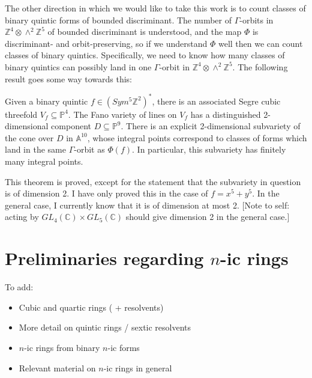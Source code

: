 \documentclass{report}
\begin{document}
The other direction in which we would like to take this work is to count classes of binary quintic forms of bounded discriminant.  The number of $\Gamma$-orbits in $\mathbb{Z}^4 \otimes \wedge^2 \mathbb{Z}^5$ of bounded discriminant is understood, and the map $\Phi$ is discriminant- and orbit-preserving, so if we understand $\Phi$ well then we can count classes of binary quintics.  Specifically, we need to know how many classes of binary quintics can possibly land in one $\Gamma$-orbit in $\mathbb{Z}^4 \otimes \wedge^2 \mathbb{Z}^5$.  The following result goes some way towards this:

\begin{theorem} [In Progress]
Given a binary quintic $f \in (Sym^5 \mathbb{Z}^2)^*$, there is an associated Segre cubic threefold $V_f \subseteq \mathbb{P}^4$.  The Fano variety of lines on $V_f$ has a distinguished 2-dimensional component $D \subseteq \mathbb{P}^9$.  There is an explicit 2-dimensional subvariety of the cone over $D$ in $\mathbb{A}^{10}$, whose integral points correspond to classes of forms which land in the same $\Gamma$-orbit as $\Phi(f)$.  In particular, this subvariety has finitely many integral points.
\end{theorem}

This theorem is proved, except for the statement that the subvariety in question is of dimension 2.   I have only proved this in the case of $f = x^5 + y^5$.  In the general case, I currently know that it is of dimension at most 2.  [Note to self: acting by $GL_4(\mathbb{C}) \times GL_5(\mathbb{C})$ should give dimension 2 in the general case.]

\chapter{Preliminaries regarding $n$-ic rings}

To add:
\begin{itemize}
\item Cubic and quartic rings ( + resolvents)
\item More detail on quintic rings / sextic resolvents
\item $n$-ic rings from binary $n$-ic forms
\item Relevant material on $n$-ic rings in general
\end{itemize}
\end{document}
